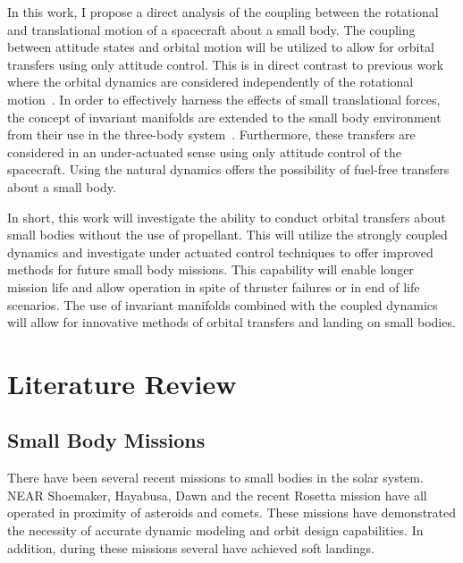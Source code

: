 \documentclass[11pt]{article} %
\begin{document}

In this work, I propose a direct analysis of the coupling between the rotational and translational motion of a spacecraft about a small body. 
The coupling between attitude states and orbital motion will be utilized to allow for orbital transfers using only attitude control.
This is in direct contrast to previous work where the orbital dynamics are considered independently of the rotational motion~\cite{kubota2003,antreasian2002}.
In order to effectively harness the effects of small translational forces, the concept of invariant manifolds are extended to the small body environment from their use in the three-body system~\cite{koon2000}. 
Furthermore, these transfers are considered in an under-actuated sense using only attitude control of the spacecraft.
Using the natural dynamics offers the possibility of fuel-free transfers about a small body.

In short, this work will investigate the ability to conduct orbital transfers about small bodies without the use of propellant.
This will utilize the strongly coupled dynamics and investigate under actuated control techniques to offer improved methods for future small body missions.
This capability will enable longer mission life and allow operation in spite of thruster failures or in end of life scenarios.
The use of invariant manifolds combined with the coupled dynamics will allow for innovative methods of orbital transfers and landing on small bodies.

%
%
%
%

\section{Literature Review}
\subsection{Small Body Missions}
There have been several recent missions to small bodies in the solar system.
NEAR Shoemaker, Hayabusa, Dawn and the recent Rosetta mission have all operated in proximity of asteroids and comets.
These missions have demonstrated the necessity of accurate dynamic modeling and orbit design capabilities.
In addition, during these missions several have achieved soft landings. 
\end{document}
